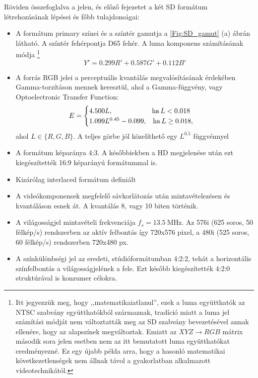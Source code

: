Röviden összefoglalva a jelen, és előző fejezetet a két SD formátum létrehozásának lépései és főbb tulajdonságai:
\begin{itemize}
\item A formátum primary színei és a színtér gamutja a \ref{Fig:SD_gamut} (a) ábrán látható.
A színtér fehérpontja D65 fehér.
A luma komponens számításának módja \footnote{Itt jegyezzük meg, hogy ,,matematikaiatlanul'', ezek a luma együtthatók az NTSC szabvány együtthatókból származnak, tradíció miatt a luma jel számítási módját nem változtatták meg az SD szabvány bevezetésével annak ellenére, hogy az alapszínek megváltoztak. 
Emiatt az $XYZ \rightarrow RGB$ mátrix második sora jelen esetben nem az itt bemutatott luma együtthatókat eredményezné.
Ez egy újabb példa arra, hogy a hasonló matematikai következetlenségek nem állnak távol a gyakorlatban alkalmazott videotechnikától.}
\begin{equation}
Y' = 0.299 R' + 0.587 G' + 0.112 B'
\end{equation}
\item A forrás RGB jelei a perceptuális kvantálás megvalósításának érdekében Gamma-torzításon mennek keresztül, ahol a Gamma-függvény, vagy Optoelectronic Transfer Function:
\begin{equation}
E = 
\begin{cases}
4.500 L, \hspace{20mm} \mathrm{ha}\, L < 0.018 \\
1.099 L^{0.45} - 0.099, \hspace{3mm} \mathrm{ha}\, L \geq 0.018,
\end{cases}
\end{equation}
ahol $L \in \{ R, G, B \}$.
A teljes görbe jól közelíthető egy $L^{0.5}$ függvénnyel
\item A formátum képaránya 4:3. 
A későbbiekben a HD megjelenése után ezt kiegészítették 16:9 képarányú formátummal is.
\item Kizárólag interlaced formátum definiált
\item A videókomponensek megfelelő sávkorlátozás után mintavételezésen és kvantáláson esnek át.
A kvantálás 8, vagy 10 biten történik.
\item A világosságjel mintavételi frekvenciája $f_s = 13.5~\mathrm{MHz}$.
Az 576i (625 soros, 50 félkép/s) rendszerben az aktív felbontás így 720x576 pixel, a 480i (525 soros, 60 félkép/s) rendszerben 720x480 px.
\item A színkülönbségi jel az eredeti, stúdióformátumban 4:2:2, tehát a horizontális színfelbontás a világosságjelének a fele.
Ezt később kiegészítették 4:2:0 struktúrával is konzumer célokra.
\end{itemize}

